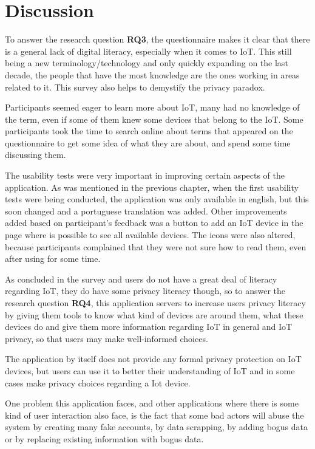 %
%
\section{Discussion}

To answer the research question \textbf{RQ3}, the questionnaire makes it clear that there is
a general lack of digital literacy, especially when it comes to IoT.
This still being a new terminology/technology and only quickly expanding
on the last decade, the people that have the most knowledge are the
ones working in areas related to it. This survey also helps to demystify
the privacy paradox.

Participants seemed eager to learn more about IoT, many had no
knowledge of the term, even if some of them knew some devices
that belong to the IoT. Some participants took the time to search
online about terms that appeared on the questionnaire to get some
idea of what they are about, and spend some time discussing them.

The usability tests were very important in improving certain aspects of the
application. As was mentioned in the previous chapter, when the first
usability tests were being conducted, the application was only available
in english, but this soon changed and a portuguese translation was added.
Other improvements added based on participant's feedback was a button
to add an IoT device in the page where is possible to see all available
devices. The icons were also altered, because participants complained that
they were not sure how to read them, even after using for some time.

As concluded in the survey and users do not have a great deal of literacy
regarding IoT, they do have some privacy literacy though, so
to answer the research question \textbf{RQ4}, this application servers to increase users
privacy literacy by giving them tools to know what kind of devices
are around them, what these devices do and give them more information
regarding IoT in general and IoT privacy, so that users may make
well-informed choices.

The application by itself does not provide any formal privacy protection
on IoT devices, but users can use it to better their understanding of IoT
and in some cases make privacy choices regarding a Iot device.

One problem this application faces, and other applications where there is
some kind of user interaction also face, is the fact that some bad
actors will abuse the system by creating many fake accounts, by
data scrapping, by adding bogus data or by replacing existing information
with bogus data.

